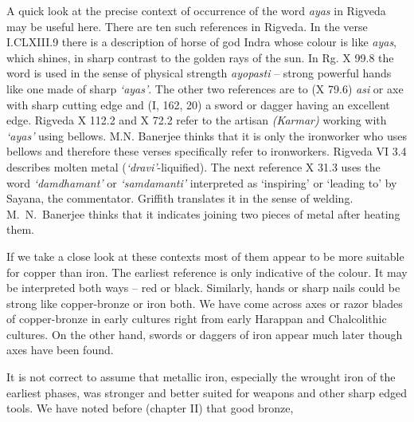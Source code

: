 A quick look at the precise context of occurrence of the word \textit{ayas} in Rigveda may be useful here. There are ten such references in Rigveda. In the verse I.CLXIII.9 there is a description of horse of god Indra whose colour is like \textit{ayas}, which shines, in sharp contrast to the golden rays of the sun. In Rg. X 99.8 the word is used in the sense of physical strength \textit{ayopasti} – strong powerful hands like one made of sharp \textit{‘ayas’}. The other two references are to (X 79.6) \textit{asi} or axe with sharp cutting edge and (I, 162, 20) a sword or dagger having an excellent edge. Rigveda X 112.2 and X 72.2 refer to the artisan \textit{(Karmar)} working with \textit{‘ayas’} using bellows. M.N. Banerjee thinks that it is only the ironworker who uses bellows and therefore these verses specifically refer to ironworkers. Rigveda VI 3.4 describes molten metal (\textit{‘dravi’}-liquified). The next reference X 31.3 uses the word \textit{‘damdhamant’} or \textit{‘samdamanti’} interpreted as ‘inspiring’ or ‘leading to’ by Sayana, the commentator. Griffith translates it in the sense of welding. M.~N.~Banerjee thinks that it indicates joining two pieces of metal after heating them.

If we take a close look at these contexts most of them appear to be more suitable for copper than iron. The earliest reference is only indicative of the colour. It may be interpreted both ways – red or black. Similarly, hands or sharp nails could be strong like copper-bronze or iron both. We have come across axes or razor blades of copper-bronze in early cultures right from early Harappan and Chalcolithic cultures. On the other hand, swords or daggers of iron appear much later though axes have been found.

It is not correct to assume that metallic iron, especially the wrought iron of the earliest phases, was stronger and better suited for weapons and other sharp edged tools. We have noted before (chapter II) that good bronze,

